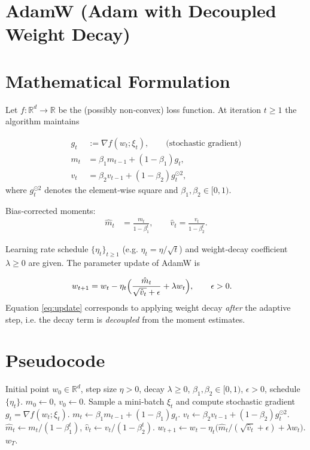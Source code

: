 \documentclass{article}
\newcommand{\RR}{\mathbb{R}}
\begin{document}
\section*{AdamW (Adam with Decoupled Weight Decay)}

\section*{Mathematical Formulation}
Let $f:\RR^{d}\rightarrow\RR$ be the (possibly non‑convex) loss function.  
At iteration $t\ge 1$ the algorithm maintains

\begin{align}
g_t &:= \nabla f(w_t; \xi_t), \qquad\text{(stochastic gradient)}\\[4pt]
m_t &= \beta_1 m_{t-1} + (1-\beta_1) g_t, \label{eq:m}\\[4pt]
v_t &= \beta_2 v_{t-1} + (1-\beta_2) g_t^{\odot 2}, \label{eq:v}
\end{align}
where $g_t^{\odot 2}$ denotes the element‑wise square and $\beta_1,\beta_2\in[0,1)$.

Bias‑corrected moments:
\begin{align}
\hat m_t &= \frac{m_t}{1-\beta_1^{t}}, \qquad
\hat v_t = \frac{v_t}{1-\beta_2^{t}}. \label{eq:bias}
\end{align}

Learning rate schedule $\{\eta_t\}_{t\ge1}$ (e.g. $\eta_t=\eta/\sqrt{t}$) and weight‑decay coefficient $\lambda\ge0$ are given.  
The parameter update of AdamW is

\begin{align}
w_{t+1}
&= w_t - \eta_t\Bigl( \frac{\hat m_t}{\sqrt{\hat v_t}+\epsilon} + \lambda w_t \Bigr), 
\qquad \epsilon>0. \label{eq:update}
\end{align}
Equation \eqref{eq:update} corresponds to applying weight decay \emph{after} the adaptive step, i.e. the decay term is \emph{decoupled} from the moment estimates.

\section*{Pseudocode}
\begin{algorithm}[H]
\caption{AdamW}
\begin{algorithmic}[1]
\REQUIRE Initial point $w_0\in\RR^{d}$, step size $\eta>0$, decay $\lambda\ge0$, 
        $\beta_1,\beta_2\in[0,1)$, $\epsilon>0$, schedule $\{\eta_t\}$.
\STATE $m_0\gets 0$, $v_0\gets 0$.
    \STATE Sample a mini‑batch $\xi_t$ and compute stochastic gradient $g_t=\nabla f(w_t;\xi_t)$.
    \STATE $m_t\gets \beta_1 m_{t-1}+(1-\beta_1)g_t$.
    \STATE $v_t\gets \beta_2 v_{t-1}+(1-\beta_2)g_t^{\odot 2}$.
    \STATE $\hat m_t\gets m_t/(1-\beta_1^{t})$, \quad $\hat v_t\gets v_t/(1-\beta_2^{t})$.
    \STATE $w_{t+1}\gets w_t-\eta_t\bigl(\hat m_t/(\sqrt{\hat v_t}+\epsilon)+\lambda w_t\bigr)$.
\ENDFOR
\RETURN $w_T$.
\end{algorithmic}
\end{algorithm}
\end{document}
